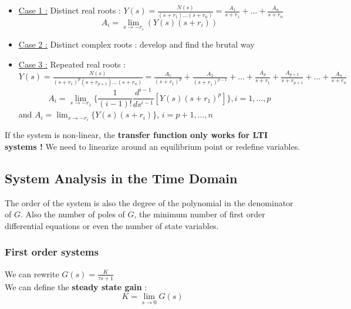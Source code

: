 \documentclass[../main.tex]{subfiles}
\begin{document}
\begin{itemize}
    \item \underline{Case 1 :} Distinct real roots : $Y(s) = \frac{N(s)}{(s+r_1)\dots (s+r_n)} = \frac{A_1}{s+r_1}+\dots+\frac{A_n}{s+r_n}$\begin{equation}
        A_i = \lim_{s\rightarrow -r_i} (Y(s)(s+r_i))
    \end{equation}
    \item \underline{Case 2 :} Distinct complex roots : develop and find the brutal way\\
    \item \underline{Case 3 :} Repeated real roots : $Y(s) = \frac{N(s)}{(s+r_1)^p(s+r_{p+1})\dots (s+r_n)} = \frac{A_1}{(s+r_1)^p}+\frac{A_2}{(s+r_1)^{p-1}}+\dots + \frac{A_p}{s+r_1}+\frac{A_{p+1}}{s+r_{p+1}}+\dots + \frac{A_n}{s+r_n}$\begin{equation}
        A_i = \lim_{s\rightarrow -r_1} \{ \frac{1}{(i-1)!} \frac{d^{i-1}}{ds^{i-1}}[Y(s)(s+r_1)^p]\}, i=1,\dots,p
    \end{equation}
    and $A_i = \lim_{s\rightarrow -r_i} \{Y(s) (s+r_i)\}$, $i=p+1, \dots, n$\\
\end{itemize}

If the system is non-linear, the \textbf{transfer function only works for LTI systems !} We need to linearize around an equilibrium point or redefine variables.\\


\subsection{System Analysis in the Time Domain}
The order of the system is also the degree of the polynomial in the denominator of $G$. Also the number of poles of $G$, the minimum number of first order differential equations or even the number of state variables.\\

\subsubsection{First order systems}
We can rewrite $G(s) = \frac{K}{\tau s+1}$\\

We can define the \textbf{steady state gain} : \begin{equation}
    K = \lim_{s\rightarrow 0} G(s)
\end{equation}
\end{document}
